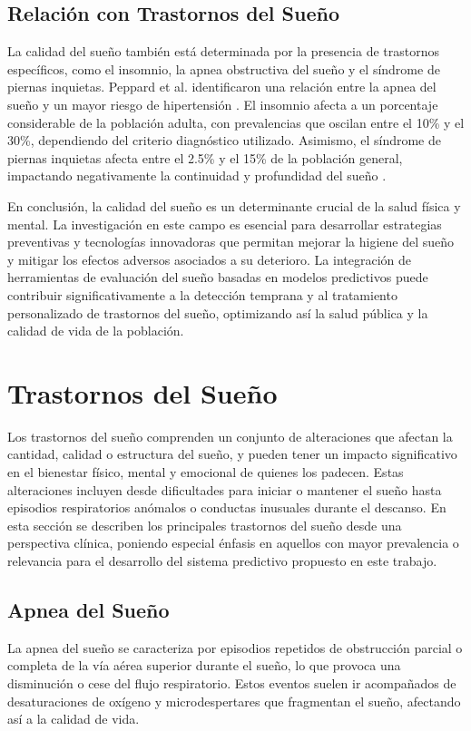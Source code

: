 \subsection{Relación con Trastornos del Sueño}

La calidad del sueño también está determinada por la presencia de trastornos específicos, como el insomnio, la apnea obstructiva del sueño y el síndrome de piernas inquietas. Peppard et al. identificaron una relación entre la apnea del sueño y un mayor riesgo de hipertensión \cite{peppard2000prospective}. El insomnio afecta a un porcentaje considerable de la población adulta, con prevalencias que oscilan entre el 10\% y el 30\%, dependiendo del criterio diagnóstico utilizado. Asimismo, el síndrome de piernas inquietas afecta entre el 2.5\% y el 15\% de la población general, impactando negativamente la continuidad y profundidad del sueño \cite{baglioni2016sleep}.


En conclusión, la calidad del sueño es un determinante crucial de la salud física y mental. La investigación en este campo es esencial para desarrollar estrategias preventivas y tecnologías innovadoras que permitan mejorar la higiene del sueño y mitigar los efectos adversos asociados a su deterioro. La integración de herramientas de evaluación del sueño basadas en modelos predictivos puede contribuir significativamente a la detección temprana y al tratamiento personalizado de trastornos del sueño, optimizando así la salud pública y la calidad de vida de la población.



\section{Trastornos del Sueño}


Los trastornos del sueño comprenden un conjunto de alteraciones que afectan la cantidad, calidad o estructura del sueño, y pueden tener un impacto significativo en el bienestar físico, mental y emocional de quienes los padecen. Estas alteraciones incluyen desde dificultades para iniciar o mantener el sueño hasta episodios respiratorios anómalos o conductas inusuales durante el descanso. En esta sección se describen los principales trastornos del sueño desde una perspectiva clínica, poniendo especial énfasis en aquellos con mayor prevalencia o relevancia para el desarrollo del sistema predictivo propuesto en este trabajo.

\subsection{Apnea del Sueño}
La apnea del sueño se caracteriza por episodios repetidos de obstrucción parcial o completa de la vía aérea superior durante el sueño, lo que provoca una disminución o cese del flujo respiratorio. Estos eventos suelen ir acompañados de desaturaciones de oxígeno y microdespertares que fragmentan el sueño, afectando así a la calidad de vida. 

